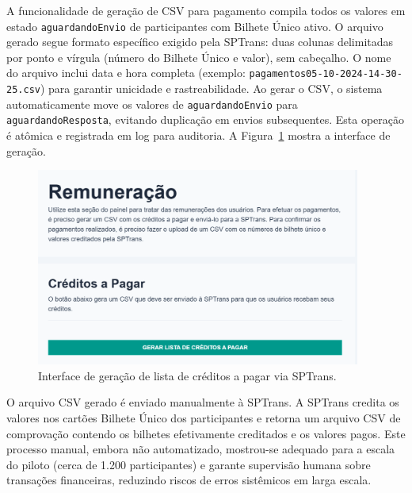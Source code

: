 A funcionalidade de geração de CSV
para pagamento compila todos os valores em estado \texttt{aguardandoEnvio} de
participantes com Bilhete Único ativo. O arquivo gerado segue formato específico
exigido pela SPTrans: duas colunas delimitadas por ponto e vírgula (número do
Bilhete Único e valor), sem cabeçalho. O nome do arquivo inclui data e hora completa (exemplo:
\texttt{pagamentos05-10-2024-14-30-25.csv}) para garantir unicidade e
rastreabilidade. Ao gerar o CSV, o sistema automaticamente move os valores de
\texttt{aguardandoEnvio} para \texttt{aguardandoResposta}, evitando duplicação em
envios subsequentes. Esta operação é atômica e registrada em log para auditoria. A Figura~\ref{fig:remuneracao_gerar_csv_form_creditos} mostra a interface de geração.

\begin{figure}[H]
    \centering
    \includegraphics[width=0.95\textwidth]{figuras/remuneracao_creditos.png}
    \caption{Interface de geração de lista de créditos a pagar via SPTrans.}
    \label{fig:remuneracao_gerar_csv_form_creditos}
  \end{figure}

O arquivo CSV gerado é enviado
manualmente à SPTrans. A SPTrans credita os valores nos cartões Bilhete
Único dos participantes e retorna um arquivo CSV de comprovação contendo os bilhetes
efetivamente creditados e os valores pagos. Este processo manual, embora não
automatizado, mostrou-se adequado para a escala do piloto (cerca de 1.200
participantes) e garante supervisão humana sobre transações financeiras, reduzindo
riscos de erros sistêmicos em larga escala.



